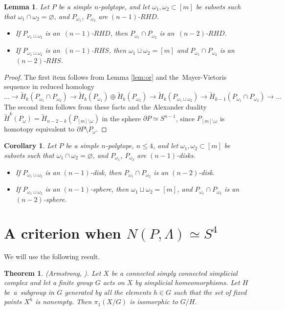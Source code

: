 \documentclass[12pt]{amsart}
\newtheorem{corollary}[formula]{Corollary}
\newtheorem{lemma}[formula]{Lemma}
\newtheorem{theorem}[formula]{Theorem}
\theoremstyle{definition}
\theoremstyle{remark}
\begin{document}
\begin{lemma}\label{lem:k=2}
Let $P$ be a simple $n$-polytope, and  let $\omega_1,\omega_2\subset[m]$ be
subsets such that $\omega_1\cap\omega_2=\varnothing$, 
and $P_{\omega_1}$, $P_{\omega_2}$ are $(n-1)$-$RHD$. 
\begin{itemize}
\item If $P_{\omega_1\sqcup\omega_2}$ is  an~$(n-1)$-$RHD$,
then $P_{\omega_1}\cap P_{\omega_2}$ is an~$(n-2)$-$RHD$. 
\item If $P_{\omega_1\sqcup\omega_2}$ is  an~$(n-1)$-$RHS$,
then $\omega_1\sqcup \omega_2=[m]$ and  $P_{\omega_1}\cap P_{\omega_2}$ is an  $(n-2)$-$RHS$.
\end{itemize}
\end{lemma}
\begin{proof}
The first item follows from Lemma \ref{lem:or}  and the~Mayer-Vietoris sequence in reduced homology 
$$
\dots\to\widetilde{H}_k(P_{\omega_1}\cap P_{\omega_2})\to 
\widetilde{H}_k(P_{\omega_1})\oplus \widetilde{H}_k(P_{\omega_2})\to
\widetilde{H}_k(P_{\omega_1\sqcup\omega_2})\to \widetilde{H}_{k-1}(P_{\omega_1}\cap P_{\omega_2})\to\dots
$$
The second item follows from these facts and the Alexander duality 
$\widetilde{H}^{k}(P_{\omega})=\widetilde{H}_{n-2-k}(P_{[m]\setminus\omega})$ in the sphere 
$\partial P\simeq S^{n-1}$, since $P_{[m]\setminus\omega}$ is homotopy equivalent to 
$\partial P\setminus P_{\omega}$. 
\end{proof}
\begin{corollary}
Let $P$ be a simple $n$-polytope, $n\leqslant 4$, and  let $\omega_1,\omega_2\subset[m]$ be
subsets such that $\omega_1\cap\omega_2=\varnothing$, 
and $P_{\omega_1}$, $P_{\omega_2}$  are  $(n-1)$-disks. 
\begin{itemize} 
\item If $P_{\omega_1\sqcup\omega_2}$ is an $(n-1)$-disk, then $P_{\omega_1}\cap P_{\omega_2}$ is an  $(n-2)$-disk.
\item If $P_{\omega_1\sqcup\omega_2}$ is an $(n-1)$-sphere, then $\omega_1\sqcup \omega_2=[m]$, and 
$P_{\omega_1}\cap P_{\omega_2}$ is an  $(n-2)$-sphere.
\end{itemize}
\end{corollary}

\section{A criterion when $N(P,\Lambda)\simeq S^4$}\label{sec:Sn4}
We will use the following result.
\begin{theorem} (Armstrong, \cite[Theorem 3]{A65}). Let $X$ be a connected
simply connected simplicial complex and let a finite group $G$ acts on $X$ 
by simplicial homeomorphisms.  Let $H$ be~a~subgroup in $G$ generated by all the elements 
$h\in G$ such that the set of fixed points $X^h$ is nonempty. 
Then $\pi_1(X/G)$ is isomorphic to $G/H$.
\end{theorem}
\end{document}
